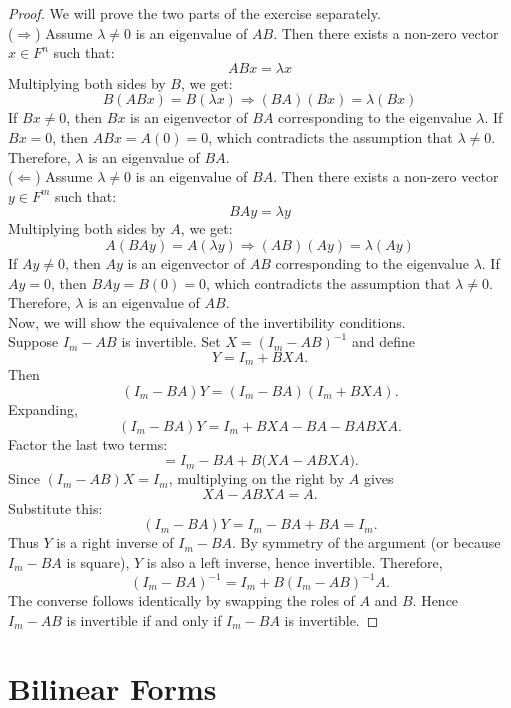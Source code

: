 \documentclass[openany]{book}
\begin{document}
\begin{proof}
We will prove the two parts of the exercise separately. \\ 
($\Rightarrow$) Assume $\lambda \neq 0$ is an eigenvalue of $AB$. Then there exists a non-zero vector $x \in F^n$ such that:
$$ABx = \lambda x$$
Multiplying both sides by $B$, we get:
$$B(ABx) = B(\lambda x) \Rightarrow (BA)(Bx) = \lambda (Bx)$$
If $Bx \neq 0$, then $Bx$ is an eigenvector of $BA$ corresponding to the eigenvalue $\lambda$. If $Bx = 0$, then $ABx = A(0) = 0$, which contradicts the assumption that $\lambda \neq 0$. Therefore, $\lambda$ is an eigenvalue of $BA$. \\
($\Leftarrow$) Assume $\lambda \neq 0$ is an eigenvalue of $BA$. Then there exists a non-zero vector $y \in F^m$ such that:
$$BAy = \lambda y$$
Multiplying both sides by $A$, we get:
$$A(BAy) = A(\lambda y) \Rightarrow (AB)(Ay) = \lambda (Ay)$$
If $Ay \neq 0$, then $Ay$ is an eigenvector of $AB$ corresponding to the eigenvalue $\lambda$. If $Ay = 0$, then $BAy = B(0) = 0$, which contradicts the assumption that $\lambda \neq 0$. Therefore, $\lambda$ is an eigenvalue of $AB$. \\
Now, we will show the equivalence of the invertibility conditions. \\
Suppose $I_m - AB$ is invertible. Set $X = (I_m - AB)^{-1}$ and define
\[
Y = I_m + BXA.
\]
Then
\[
(I_m - BA)Y 
= (I_m - BA)(I_m + BXA).
\]
Expanding,
\[
(I_m - BA)Y 
= I_m + BXA - BA - BABXA.
\]
Factor the last two terms:
\[
= I_m - BA + B\bigl(XA - A B X A \bigr).
\]
Since $(I_m - AB)X = I_m$, multiplying on the right by $A$ gives
\[
XA - ABXA = A.
\]
Substitute this:
\[
(I_m - BA)Y = I_m - BA + B A = I_m.
\]
Thus $Y$ is a right inverse of $I_m - BA$. By symmetry of the argument (or because $I_m - BA$ is square), $Y$ is also a left inverse, hence invertible. Therefore,
\[
(I_m - BA)^{-1} = I_m + B (I_m - AB)^{-1} A.
\]
The converse follows identically by swapping the roles of $A$ and $B$. Hence $I_m - AB$ is invertible if and only if $I_m - BA$ is invertible.
\end{proof}
\chapter{Bilinear Forms}
\end{document}
